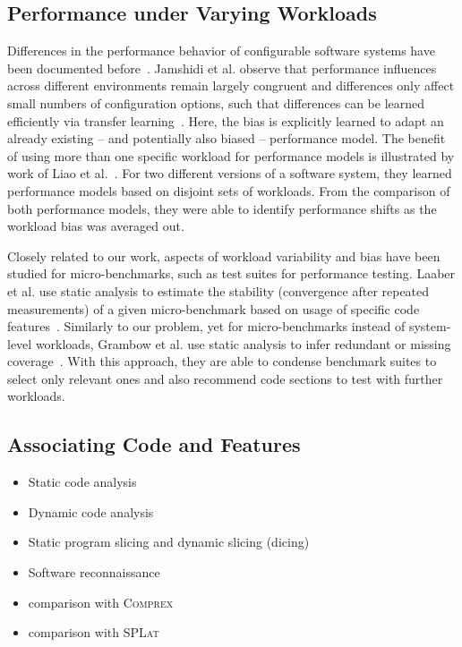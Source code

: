\subsection{Performance under Varying Workloads}
Differences in the performance behavior of configurable software systems have been documented before~\cite{jamishidi_transfer_2017,alves_sampling_2020}. Jamshidi et al. observe that performance influences across different environments remain largely congruent and differences only affect small numbers of configuration options, such that differences can be learned efficiently via transfer learning~\cite{jamishidi_transfer_2017,jamshidi_learning_2018,jamshidi_transfer_gp_2017,ding_bayesian_2020}. Here, the bias is explicitly learned to adapt an already existing – and potentially also biased -- performance model. The benefit of using more than one specific workload for performance models is illustrated by work of Liao et al.~\cite{liao_2020_using_emse}. For two different versions of a software system, they learned performance models based on disjoint sets of workloads. From the comparison of both performance models, they were able to identify performance shifts as the workload bias was averaged out.

Closely related to our work, aspects of workload variability and bias have been studied for micro-benchmarks, such as test suites for performance testing. Laaber et al. use static analysis to estimate the stability (convergence after repeated measurements) of a given micro-benchmark based on usage of specific code features~\cite{laaber_emse_2021}. Similarly to our problem, yet for micro-benchmarks instead of system-level workloads, Grambow et al. use static analysis to infer redundant or missing coverage~\cite{grambow_peerj_2021}. With this approach, they are able to condense benchmark suites to select only relevant ones and also recommend code sections to test with further workloads.

\subsection{Associating Code and Features}
{\color{Orange}\begin{itemize}
	\item Static code analysis\cite{velez_2020_configcrusher_jase,lillack_2018_lotrack_tse,luo_2019_cova}
	\item Dynamic code analysis \cite{bell_phosphor_2014,velez_comprex_2021}
	\item Static program slicing and dynamic slicing (dicing)
	\item Software reconnaissance ~\cite{wong_integrated_2005,wilde_early_1996,agrawal_fault_1995,simmons_industrial_2006,chen_dynamic_nodate,sherwood_reducing_nodate}
\end{itemize}
\begin{itemize}
	\item comparison with \textsc{Comprex}~\cite{velez_comprex_2021}
	\item comparison with \textsc{SPLat}~\cite{splat_kim_2013}
\end{itemize}}


